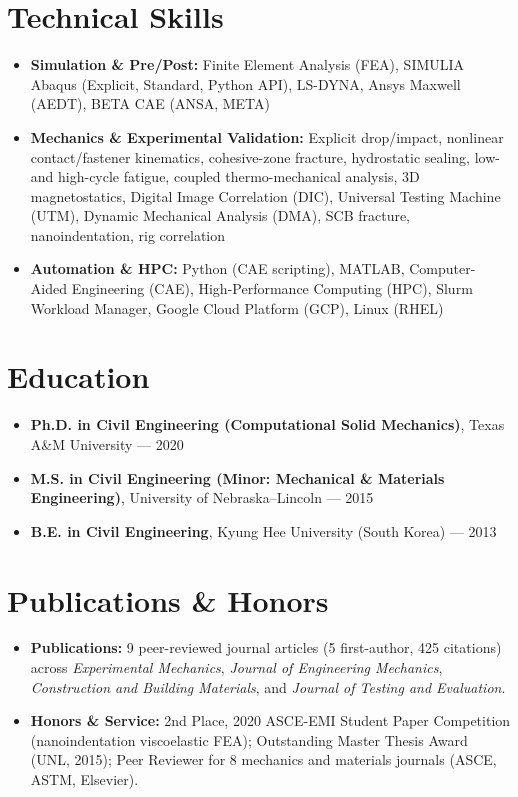 \documentclass[10pt,letterpaper]{article}
\newcommand{\eduitem}[2]{%
  \item #1 --- #2
}
\begin{document}
\section*{Technical Skills}
\begin{itemize}
  \item \textbf{Simulation \& Pre/Post:} Finite Element Analysis (FEA), SIMULIA Abaqus (Explicit, Standard, Python API), LS-DYNA, Ansys Maxwell (AEDT), BETA CAE (ANSA, META)
  \item \textbf{Mechanics \& Experimental Validation:} Explicit drop/impact, nonlinear contact/fastener kinematics, cohesive-zone fracture, hydrostatic sealing, low- and high-cycle fatigue, coupled thermo-mechanical analysis, 3D magnetostatics, Digital Image Correlation (DIC), Universal Testing Machine (UTM), Dynamic Mechanical Analysis (DMA), SCB fracture, nanoindentation, rig correlation
  \item \textbf{Automation \& HPC:} Python (CAE scripting), MATLAB, Computer-Aided Engineering (CAE), High-Performance Computing (HPC), Slurm Workload Manager, Google Cloud Platform (GCP), Linux (RHEL)
\end{itemize}

\section*{Education}
\begin{itemize}
  \eduitem{\textbf{Ph.D. in Civil Engineering (Computational Solid Mechanics)}, Texas A\&M University}{2020}
  \eduitem{\textbf{M.S. in Civil Engineering (Minor: Mechanical \& Materials Engineering)}, University of Nebraska--Lincoln}{2015}
  \eduitem{\textbf{B.E. in Civil Engineering}, Kyung Hee University (South Korea)}{2013}
\end{itemize}

\section*{Publications \& Honors}
\begin{itemize}
  \item \textbf{Publications:} 9 peer-reviewed journal articles (5 first-author, 425 citations) across \textit{Experimental Mechanics}, \textit{Journal of Engineering Mechanics}, \textit{Construction and Building Materials}, and \textit{Journal of Testing and Evaluation}.
  \item \textbf{Honors \& Service:} 2nd Place, 2020 ASCE-EMI Student Paper Competition (nanoindentation viscoelastic FEA); Outstanding Master Thesis Award (UNL, 2015); Peer Reviewer for 8 mechanics and materials journals (ASCE, ASTM, Elsevier).
\end{itemize}
\end{document}
